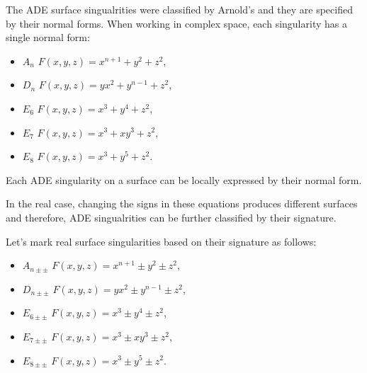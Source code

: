 The ADE surface singualrities were classified by Arnold's
\cite{arnol1972normal} and they are specified by their normal forms.
When working in complex space, each singularity has a single normal form:
\begin{itemize}
    \item $A_n$ \hspace{5mm} $F(x,y,z)=x^{n+1}+y^2+z^2$,
    \item $D_n$ \hspace{5mm} $F(x,y,z)=yx^2+y^{n-1}+z^2$,
    \item $E_6$ \hspace{5mm} $F(x,y,z)=x^3+y^4+z^2$,
    \item $E_7$ \hspace{5mm} $F(x,y,z)=x^3+xy^3+z^2$,
    \item $E_8$ \hspace{5mm} $F(x,y,z)=x^3+y^5+z^2$.
\end{itemize}

Each ADE singularity on a surface can be locally expressed by their
normal form.

In the real case, changing the signs in these equations produces different
surfaces and therefore, ADE singualrities can be further classified by their
signature.

\begin{definition}
    Let's mark real surface singularities based on their signature as follows:
    \begin{itemize}
        \item $A_{n\pm\pm}$ \hspace{5mm} $F(x,y,z)=x^{n+1}\pm y^2\pm z^2$,
              
        \item $D_{n\pm\pm}$ \hspace{5mm} $F(x,y,z)=yx^2\pm y^{n-1}\pm z^2$,
        
        \item $E_{6\pm\pm}$ \hspace{5mm} $F(x,y,z)=x^3\pm y^4\pm z^2$,
        
        \item $E_{7\pm\pm}$ \hspace{5mm} $F(x,y,z)=x^3\pm xy^3\pm z^2$,
        
        \item $E_{8\pm\pm}$ \hspace{5mm} $F(x,y,z)=x^3\pm y^5\pm z^2$.
        \end{itemize}
\end{definition}

